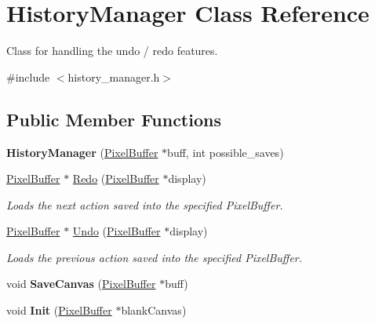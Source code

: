 \hypertarget{classHistoryManager}{}\section{History\+Manager Class Reference}
\label{classHistoryManager}


Class for handling the undo / redo features.  




{\ttfamily \#include $<$history\+\_\+manager.\+h$>$}

\subsection*{Public Member Functions}
\begin{DoxyCompactItemize}
\item 
{\bfseries History\+Manager} (\hyperlink{classimage__tools_1_1PixelBuffer}{Pixel\+Buffer} $\ast$buff, int possible\+\_\+saves)\hypertarget{classHistoryManager_a17fa4abb7cd55bc5b3db35e7a167ebc1}{}\label{classHistoryManager_a17fa4abb7cd55bc5b3db35e7a167ebc1}

\item 
\hyperlink{classimage__tools_1_1PixelBuffer}{Pixel\+Buffer} $\ast$ \hyperlink{classHistoryManager_ad748a9e31638b3519b4a0fc67b2bdea8}{Redo} (\hyperlink{classimage__tools_1_1PixelBuffer}{Pixel\+Buffer} $\ast$display)
\begin{DoxyCompactList}\small\item\em Loads the next action saved into the specified Pixel\+Buffer. \end{DoxyCompactList}\item 
\hyperlink{classimage__tools_1_1PixelBuffer}{Pixel\+Buffer} $\ast$ \hyperlink{classHistoryManager_a8fdf7742793182c75d40ebe67296e9b6}{Undo} (\hyperlink{classimage__tools_1_1PixelBuffer}{Pixel\+Buffer} $\ast$display)
\begin{DoxyCompactList}\small\item\em Loads the previous action saved into the specified Pixel\+Buffer. \end{DoxyCompactList}\item 
void {\bfseries Save\+Canvas} (\hyperlink{classimage__tools_1_1PixelBuffer}{Pixel\+Buffer} $\ast$buff)\hypertarget{classHistoryManager_ad854ff27de36d1d0307ee95a319d0cc3}{}\label{classHistoryManager_ad854ff27de36d1d0307ee95a319d0cc3}

\item 
void {\bfseries Init} (\hyperlink{classimage__tools_1_1PixelBuffer}{Pixel\+Buffer} $\ast$blank\+Canvas)\hypertarget{classHistoryManager_a6427f42c8d21104a906a32a67259fe6d}{}\label{classHistoryManager_a6427f42c8d21104a906a32a67259fe6d}


\end{DoxyCompactItemize}
